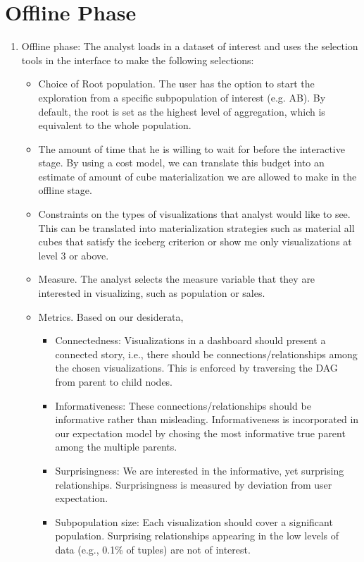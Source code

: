 \section*{Offline Phase}
\begin{enumerate}
\item  Offline phase: The analyst loads in a dataset of interest and uses the selection tools in the interface to make the following selections:
\begin{itemize}
\item Choice of Root population. The user has the option to start the exploration from a specific subpopulation of interest (e.g. AB). By default, the root is set as the highest level of aggregation, which is equivalent to the whole population.
\item  The amount of time that he is willing to wait for before the interactive stage. By using a cost model, we can translate this budget into an estimate of amount of cube materialization we are allowed to make in the offline stage. 
\item Constraints on the types of visualizations that analyst would like to see. This can be translated into materialization strategies such as material all cubes that satisfy the iceberg criterion or show me only visualizations at level 3 or above.
\item Measure. The analyst selects the measure variable that they are interested in visualizing, such as population or sales.
\item Metrics. Based on our desiderata, 
  \begin{itemize}
    \item Connectedness: Visualizations in a dashboard should present a connected story, i.e., there should be connections/relationships among the chosen visualizations. This is enforced by traversing the DAG from parent to child nodes.
    \item Informativeness: These connections/relationships should be informative rather than misleading. Informativeness is incorporated in our expectation model by chosing the most informative true parent among the multiple parents.
    \item Surprisingness: We are interested in the informative, yet surprising relationships. Surprisingness is measured by deviation from user expectation.
    \item Subpopulation size: Each visualization should cover a significant population. Surprising relationships appearing in the low levels of data (e.g., 0.1\% of tuples) are not of interest.

\end{itemize}
\end{itemize}
\end{enumerate}
